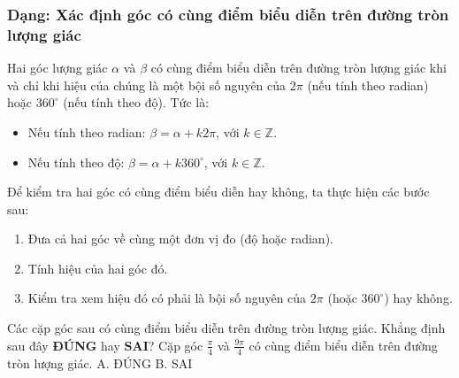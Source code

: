 \subsubsection{Dạng: Xác định góc có cùng điểm biểu diễn trên đường tròn lượng giác}
\begin{phuongphap}
Hai góc lượng giác $\alpha$ và $\beta$ có cùng điểm biểu diễn trên đường tròn lượng giác khi và chỉ khi hiệu của chúng là một bội số nguyên của $2\pi$ (nếu tính theo radian) hoặc $360^\circ$ (nếu tính theo độ).
Tức là:
\begin{itemize}
    \item Nếu tính theo radian: $ \beta = \alpha + k2\pi $, với $k \in \mathbb{Z}$.
    \item Nếu tính theo độ: $ \beta = \alpha + k360^\circ $, với $k \in \mathbb{Z}$.
\end{itemize}
Để kiểm tra hai góc có cùng điểm biểu diễn hay không, ta thực hiện các bước sau:
\begin{enumerate}
    \item Đưa cả hai góc về cùng một đơn vị đo (độ hoặc radian).
    \item Tính hiệu của hai góc đó.
    \item Kiểm tra xem hiệu đó có phải là bội số nguyên của $2\pi$ (hoặc $360^\circ$) hay không.
\end{enumerate}
\end{phuongphap}
\begin{vidumau}
Các cặp góc sau có cùng điểm biểu diễn trên đường tròn lượng giác. Khẳng định sau đây \textbf{ĐÚNG} hay $\textbf{SAI}$?
Cặp góc $ \frac{\pi}{4} $ và $ \frac{9\pi}{4} $ có cùng điểm biểu diễn trên đường tròn lượng giác.
\choice
A. ĐÚNG \True
B. SAI
\end{vidumau}

